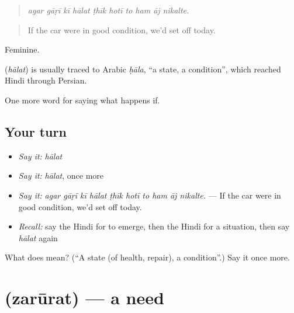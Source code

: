 \begin{quote}
         
\end{quote}

\begin{quote}
\emph{agar gāṛī kī hālat ṭhīk hotī to ham āj nikalte.}
\end{quote}

\begin{quote}
If the car were in good condition, we'd set off today.
\end{quote}

Feminine.

\begin{cousinweb}
\textbf{} (\emph{hālat}) is usually traced to Arabic \emph{ḥāla}, \textquotedblleft{}a state, a condition\textquotedblright{}, which reached Hindi through Persian.
\end{cousinweb}

\begin{grammarlens}[title={What you've built}]
One more word for saying what happens if.
\end{grammarlens}

\subsection*{Your turn}
\begin{itemize}
\raggedright
  \item \emph{Say it:} \emph{hālat}
  \item \emph{Say it:} \emph{hālat}, once more
  \item \emph{Say it:} \emph{agar gāṛī kī hālat ṭhīk hotī to ham āj nikalte.} — If the car were in good condition, we'd set off today.
  \item \emph{Recall:} say the Hindi for to emerge, then the Hindi for a situation, then say \emph{hālat} again
\end{itemize}

\begin{tcolorbox}[breakable,colback=teal!4,colframe=teal!35!black,title={Before you move on}]
What does  mean? (\textquotedblleft{}A state (of health, repair), a condition\textquotedblright{}.) Say it once more.
\end{tcolorbox}
\section[\texorpdfstring{\hi{ज़रूरत} (zarūrat)}{ज़रूरत (zarūrat)}]{ (zarūrat) — a need}

